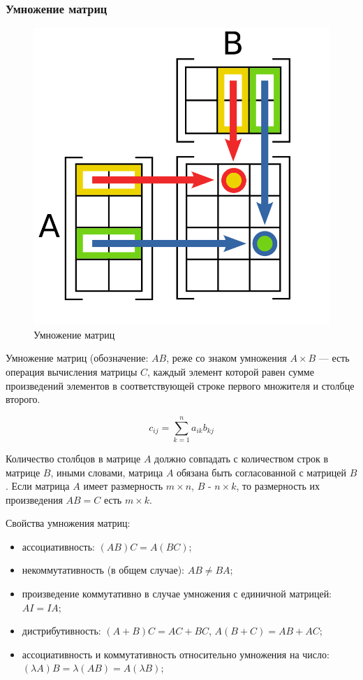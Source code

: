 \documentclass{article}
\begin{document}
\subsubsection*{Умножение матриц}
\begin{figure}
  \includegraphics[width=0.6\linewidth]{matrix-multiplication.png}
  \caption{Умножение матриц}
\end{figure}
Умножение матриц (обозначение: $AB$, реже со знаком умножения $A\times B$ — есть операция вычисления матрицы $C$,
каждый элемент которой равен сумме произведений элементов в соответствующей строке первого множителя и столбце второго.

$$c_{ij}=\sum _{k=1}^{n}a_{ik}b_{kj}$$

Количество столбцов в матрице $A$ должно совпадать с количеством строк в матрице $B$, иными словами, 
матрица $A$ обязана быть согласованной с матрицей $B$. 
Если матрица $A$ имеет размерность $m\times n$, $B$ - $ n\times k$, 
то размерность их произведения $AB=C$ есть $m\times k$.

Свойства умножения матриц:

\begin{itemize}
    \item ассоциативность: $(AB)C = A(BC)$;
    \item некоммутативность (в общем случае): $AB \neq BA$;
    \item произведение коммутативно в случае умножения с единичной матрицей: $AI = IA$;
    \item дистрибутивность: $(A+B)C = AC + BC$, $A(B+C) = AB + AC$;
    \item ассоциативность и коммутативность относительно умножения на число: $(\lambda A)B = \lambda (AB) = A(\lambda B)$;
\end{itemize}
\end{document}
